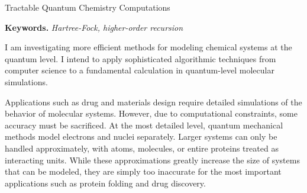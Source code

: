 \documentclass[twoside,leqno, 12pt]{article}
\date{}
\begin{document}
\begin{center}
\Large{Tractable Quantum Chemistry Computations}
\end{center}
\vspace{-0.15in}
\textbf{Keywords.}  \textit{Hartree-Fock, higher-order recursion}






I am investigating more efficient methods for modeling chemical systems at the quantum level.  I intend to apply sophisticated algorithmic techniques from computer science to a fundamental calculation in quantum-level molecular simulations.

Applications such as drug and materials design require detailed simulations of the behavior of molecular systems.  However, due to computational constraints, some accuracy must be sacrificed.  
At the most detailed level, quantum mechanical methods model electrons and nuclei separately.  Larger systems can only be handled approximately, with atoms, molecules, or entire proteins treated as interacting units.  While these approximations greatly increase the size of systems that can be modeled, they are simply too inaccurate for the most important applications such as protein folding and drug discovery.   
\end{document}
